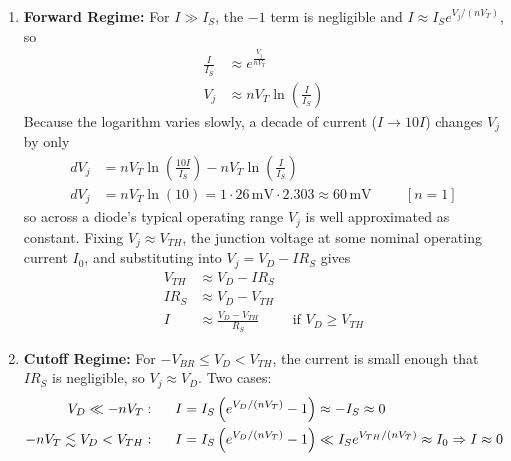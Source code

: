 \begin{enumerate}
\begin{itemize}
\begin{enumerate}
            voltage \(V_j = V_D - I R_S\), drives the exponential term:
            \[
              I = I_S \left( e^{\frac{V_D - I R_S}{n V_T}} - 1 \right)
            \]
          \item \textbf{Forward Regime:}
            For \(I \gg I_S\), the \(-1\) term is negligible and
            \(I \approx I_S e^{V_j / (nV_T)}\), so
            \begin{align*}
              \frac{I}{I_S} &\approx e^{\frac{V_j}{nV_T}} \\
              V_j &\approx n V_T \ln\!\left(\frac{I}{I_S}\right)
            \end{align*}
            Because the logarithm varies slowly, a decade of current
            (\(I \to 10 I\)) changes \(V_j\) by only
            \begin{align*}
              dV_j &= n V_T \ln\!\left(\frac{10 I}{I_S}\right) - n V_T \ln\!\left(\frac{I}{I_S}\right) \\
              dV_j &= n V_T \ln(10) = 1 \cdot 26\,\text{mV} \cdot 2.303 \approx 60\,\text{mV} \hspace{1cm} [n = 1]
            \end{align*}
            so
            across a diode's typical operating range \(V_j\) is well
            approximated as constant. Fixing \(V_j \approx V_{TH}\), the
            junction voltage at some nominal operating current \(I_0\), and
            substituting into \(V_j = V_D - I R_S\) gives
            \begin{align*}
              V_{TH} &\approx V_D - I R_S \\
              I R_S &\approx V_D - V_{TH} \\
              I &\approx \frac{V_D - V_{TH}}{R_S} \hspace{1cm} \text{if } V_D \geq V_{TH}
            \end{align*}
          \item \textbf{Cutoff Regime:}
            For \(-V_{BR} \leq V_D < V_{TH}\), the current is small enough that
            \(I R_S\) is negligible, so \(V_j \approx V_D\). Two cases:
            \begin{align*}
              V_D \ll -nV_T &: \hspace{0.5cm} I = I_S \left( e^{V_D / (nV_T)} - 1 \right) \approx -I_S \approx 0 \\
              -nV_T \lesssim V_D < V_{TH} &: \hspace{0.5cm} I = I_S \left( e^{V_D / (nV_T)} - 1 \right) \ll I_S e^{V_{TH}/(nV_T)} \approx I_0 \Rightarrow I \approx 0

\end{align*}
\end{enumerate}
\end{itemize}
\end{enumerate}
